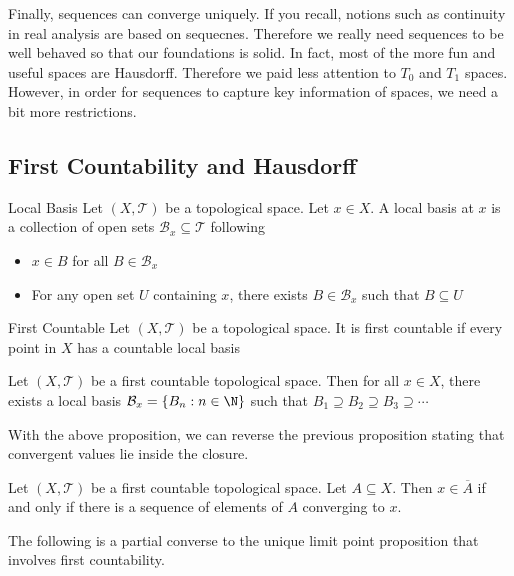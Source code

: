 \documentclass[a4paper]{article}
\begin{document}
Finally, sequences can converge uniquely. If you recall, notions such as continuity in real analysis are based on sequecnes. Therefore we really need sequences to be well behaved so that our foundations is solid. In fact, most of the more fun and useful spaces are Hausdorff. Therefore we paid less attention to $T_0$ and $T_1$ spaces. However, in order for sequences to capture key information of spaces, we need a bit more restrictions. 

\subsection{First Countability and Hausdorff}
\begin{defn}{Local Basis}{} Let $(X,\mathcal{T})$ be a topological space. Let $x\in X$. A local basis at $x$ is a collection of open sets $\mathcal{B}_x\subseteq\mathcal{T}$ following
\begin{itemize}
\item $x\in B$ for all $B\in\mathcal{B}_x$
\item For any open set $U$ containing $x$, there exists $B\in\mathcal{B}_x$ such that $B\subseteq U$
\end{itemize}
\end{defn}

\begin{defn}{First Countable}{} Let $(X,\mathcal{T})$ be a topological space. It is first countable if every point in $X$ has a countable local basis
\end{defn}

\begin{prp}{}{} Let $(X,\mathcal{T})$ be a first countable topological space. Then for all $x\in X$, there exists a local basis $\mathcal{B}_x=\{B_n:n\in\N\}$ such that $B_1\supseteq B_2\supseteq B_3\supseteq\cdots$
\end{prp}

With the above proposition, we can reverse the previous proposition stating that convergent values lie inside the closure. 

\begin{prp}{}{} Let $(X,\mathcal{T})$ be a first countable topological space. Let $A\subseteq X$. Then $x\in\overline{A}$ if and only if there is a sequence of elements of $A$ converging to $x$. 
\end{prp}

The following is a partial converse to the unique limit point proposition that involves first countability. 
\end{document}
